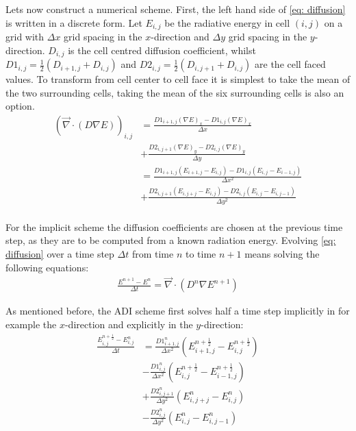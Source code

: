 Lets now construct a numerical scheme. First, the left hand side of \eqref{eq: diffusion} is written in a discrete form. Let $E_{i,j}$ be the radiative energy in cell $(i,j)$ on a grid with $\Delta x$ grid spacing in the $x$-direction and $\Delta y$ grid spacing in the $y$-direction. $D_{i,j}$ is the cell centred diffusion coefficient, whilst $D1_{i,j} = \frac{1}{2} (D_{i+1,j} + D_{i,j})$ and $D2_{i,j} = \frac{1}{2} (D_{i,j+1} + D_{i,j})$ are the cell faced values. To transform from cell center to cell face it is simplest to take the mean of the two surrounding cells, taking the mean of the six surrounding cells is also an option. 
\begin{align}
\left( \vec{\nabla} \cdot \left(D \nabla E\right) \right)_{i,j} 
 &= \frac{D1_{i+1,j} (\nabla E)_{x} - D1_{i,j} (\nabla E)_{x}}{\Delta x} \\
 &+ \frac{D2_{i,j+1} (\nabla E)_{y} - D2_{i,j} (\nabla E)_{y}}{\Delta y} \\ 
 &= \frac{D1_{i+1,j} (E_{i+1,j} - E_{i,j}) - D1_{i,j} (E_{i,j} - E_{i-1,j})}{\Delta x^2} \\
 &+ \frac{D2_{i,j+1} (E_{i,j+j} - E_{i,j}) - D2_{i,j} (E_{i,j} - E_{i,j-1})}{\Delta y^2} \\ 
\end{align}

For the implicit scheme the diffusion coefficients are chosen at the previous time step, as they are to be computed from a known radiation energy. Evolving \eqref{eq: diffusion} over a time step $\Delta t$ from time $n$ to time $n+1$ means solving the following equations:
\begin{align}
\frac{E^{n+1} - E^{n}}{\Delta t} = \vec{\nabla} \cdot \left(D^n \nabla E^{n+1}\right) \label{eq: Error_control}
\end{align}

As mentioned before, the ADI scheme first solves half a time step implicitly in for example the $x$-direction and explicitly in the $y$-direction:
\begin{align}
\frac{E_{i,j}^{n+\frac{1}{2}} - E_{i,j}^{n}}{\Delta t}
 &= \frac{D1_{i+1,j}^{n}}{\Delta x^2} (E_{i+1,j}^{n+\frac{1}{2}} - E_{i,j}^{n+\frac{1}{2}}) \\
 &- \frac{D1_{i,j}^{n}}{\Delta x^2} (E_{i,j}^{n+\frac{1}{2}} - E_{i-1,j}^{n+\frac{1}{2}}) \\
 &+ \frac{D2_{i,j+1}^{n}}{\Delta y^2} (E_{i,j+j}^{n} - E_{i,j}^{n}) \\
 &- \frac{D2_{i,j}^{n}}{\Delta y^2} (E_{i,j}^{n} - E_{i,j-1}^{n})
\end{align}

